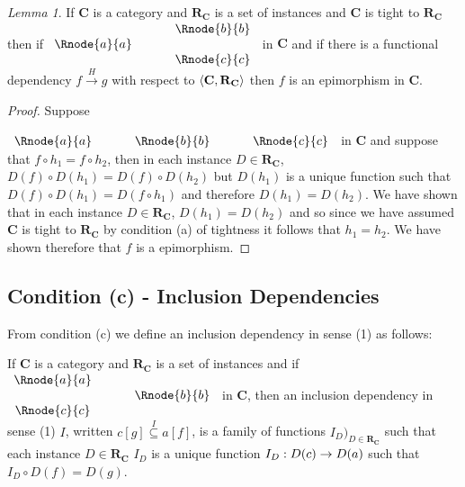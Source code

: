 \documentclass[10pt,a4paper]{article}
\theoremstyle{remark}
\newtheorem*{lemma*}{Lemma}
\newcommand{\catc}[1][C]{\textbf{#1}}
\newcommand{\reqt}{\textbf{R}}
\newcommand{\reqtc}[1][\catc]{\reqt_{#1}}
\newcommand{\fundep}[3]{#2 \xrightarrow{#1} #3}
\begin{document}
\begin{lemma*}
If $\catc$ is a category and $\reqtc$ is a set of instances and $\catc$ is tight to $\reqtc$
then if
$
\begin{array}{c p{0.5cm} c  }
             &&   \Rnode{b}{b} \\[0.01cm]
\Rnode{a}{a} &&                \\[0.01cm] 
             &&   \Rnode{c}{c}         
\end{array} 
$
in $\catc$ and if there is a functional dependency $\fundep{H}{f}{g}$ with respect to $\tuple{\catc,\reqtc}$ then 
$f$ is an epimorphism in $\catc$.
\end{lemma*}
\begin{proof}
Suppose 
\rule[-0.5cm]{0pt}{0.5cm} %
$
\begin{array}{c p{0.5cm} c p{0.5cm} c}
\Rnode{a}{a} &&   \Rnode{b}{b} &&   \Rnode{c}{c} 
\end{array} 
$
in $\catc$ and suppose that $f \circ h_1=f \circ h_2$, then in each instance 
 $D \in \reqtc$, $D(f) \circ D(h_1) = D(f) \circ D(h_2)$ but $D(h_1)$ is a unique function such that
$D(f) \circ D(h_1) = D(f \circ h_1)$ and therefore $D(h_1)=D(h_2)$. We have shown that in each instance $D \in \reqtc$, 
$D(h_1)=D(h_2)$ and so since we have assumed $\catc$ is tight to $\reqtc$  by condition (a) of tightness it
follows that $h_1=h_2$. We have shown therefore that $f$ is a epimorphism.
\end{proof}

\subsection{Condition (c) - Inclusion Dependencies}

From condition (c) we define an inclusion dependency in sense (1) as follows:
\begin{definition}
If $\catc$ is a category and $\reqtc$ is a set of instances and if
$
\begin{array}{c p{0.5cm} c  }
\Rnode{a}{a} &&                \\[0.01cm] 
             &&   \Rnode{b}{b} \\[0.01cm]
\Rnode{c}{c}         
\end{array} 
$
in $\catc$, then an inclusion dependency in sense (1) $I$, written $c[g] \overset{I}{\subseteq} a[f]$, is a family of functions $I_D)_{D \in \reqtc}$
such that each instance $D \in \reqtc$ $I_D$ is a unique function $I_D : D(c) \rightarrow D(a)$ such that
$I_D \circ D(f) = D(g)$.
\end{definition}
\end{document}
